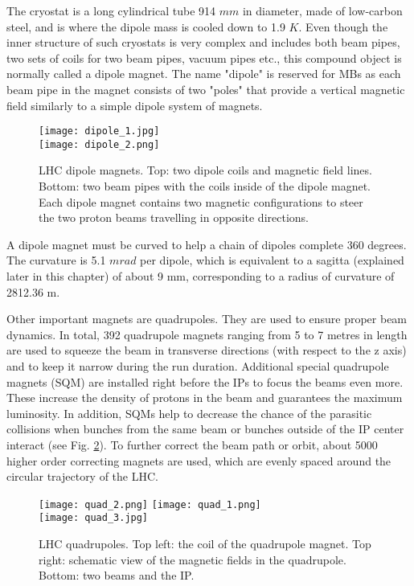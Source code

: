 \begin{normalsize}
The cryostat is a long cylindrical tube 914 $mm$ in diameter, made of low-carbon steel, and is where the dipole mass is cooled down to 1.9 $K$. Even though the inner structure of such cryostats is very complex and includes both beam pipes, two sets of coils for two beam pipes, vacuum pipes etc., this compound object is normally called a dipole magnet. The name "dipole" is reserved for MBs as each beam pipe in the magnet consists of two "poles" that provide a vertical magnetic field similarly to a simple dipole system of magnets. 


\begin{figure}[H]
\centering
\texttt{[image: dipole\_1.jpg]}\\
\vspace{0.5cm}
\texttt{[image: dipole\_2.png]}
\caption[LHC dipoles]{LHC dipole magnets. Top: two dipole coils and magnetic field lines. Bottom: two beam pipes with the coils inside of the dipole magnet. Each dipole magnet contains two magnetic configurations to steer the two proton beams travelling in opposite directions. }
\label{dipoles_coils}
\end{figure}



A  dipole magnet  must  be  curved to help a chain of dipoles complete 360 degrees. The curvature is 5.1 $mrad$ per dipole, which is equivalent to a  sagitta (explained later in this chapter) of  about  9 mm, corresponding to a radius of curvature of 2812.36 m.


Other important magnets are quadrupoles. They are used to ensure proper beam dynamics. In total, 392 quadrupole magnets ranging from 5 to 7 metres in length are used to squeeze the beam in transverse directions (with respect to the z axis) and to keep it narrow during the run duration. Additional special quadrupole magnets (SQM) are installed right before the IPs to focus the beams even more. These increase the density of protons in the beam and guarantees the maximum luminosity. In addition, SQMs help to decrease the chance of the parasitic collisions when bunches from the same beam or bunches outside of the IP center interact (see Fig. \ref{quadrupoles}). To further correct the beam path or orbit, about 5000 higher order correcting magnets are used, which are evenly spaced around the circular trajectory of the LHC. 


\begin{figure}[H]
\centering
\texttt{[image: quad\_2.png]}
\texttt{[image: quad\_1.png]}\\
\vspace{0.5cm}
\texttt{[image: quad\_3.jpg]}
\caption[LHC quadrupoles]{LHC quadrupoles. Top left: the coil of the quadrupole magnet. Top right: schematic view of the magnetic fields in the quadrupole. Bottom: two beams and the IP.}
\label{quadrupoles}
\end{figure}


\end{normalsize}
